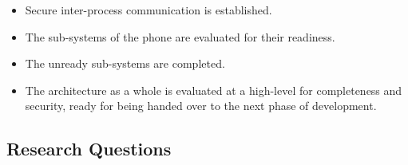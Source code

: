 \begin{itemize}
\item Secure inter-process communication is established.
\item The sub-systems of the phone are evaluated for their readiness.
\item The unready sub-systems are completed.
\item The architecture as a whole is evaluated at a high-level for completeness and security, ready for being handed over to the next phase of development.
\end{itemize} 


\subsection{Research Questions}

\label{Ch1 Sec2 Sub3}

